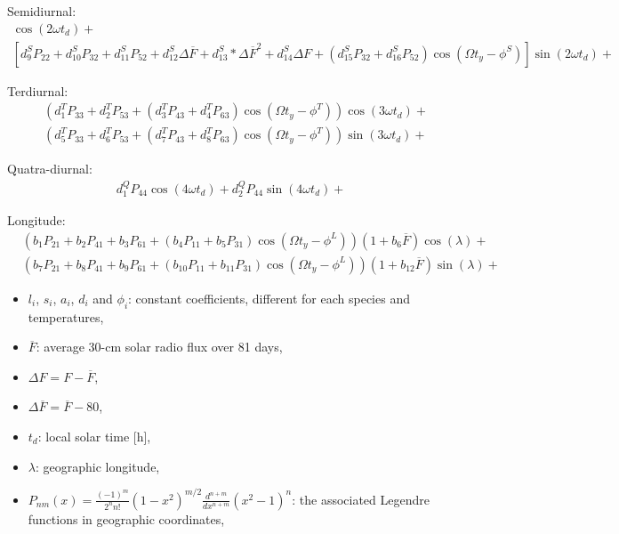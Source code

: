 \documentclass[referee,a4paper,12pt,traditabstract]{swsc}
\begin{document}
\begin{linenumbers}
Semidiurnal:
\begin{align*}
[d^S_1 P_{22} + d^S_2 P_{32} + d^S_3 P_{52} + d^S_4\Delta\overline{F} + d^S_5*\Delta\overline{F}^2 + d^S_6 \Delta F + (d^S_7 P_{32} + d^S_8 P_{52})\cos(\Omega t_y-\phi^S)]\cos(2\omega t_d) +\\
[d^S_9 P_{22} + d^S_{10} P_{32} + d^S_{11} P_{52} + d^S_{12}\Delta\overline{F} + d^S_{13}*\Delta\overline{F}^2 + d^S_{14} \Delta F + (d^S_{15} P_{32} + d^S_{16} P_{52})\cos(\Omega t_y-\phi^S)]\sin(2\omega t_d)+
\end{align*}

Terdiurnal:
\begin{align*}
&(d^T_1P_{33} + d^T_2 P_{53} + (d^T_3 P_{43} + d^T_4P_{63})\cos(\Omega t_y-\phi^T))\cos(3\omega t_d)+\\
&(d^T_5P_{33} + d^T_6 P_{53} + (d^T_7 P_{43} + d^T_8P_{63})\cos(\Omega t_y-\phi^T))\sin(3\omega t_d)+
\end{align*}

Quatra-diurnal:
\begin{align*}
d^Q_1 P_{44}\cos(4 \omega t_d) + d^Q_2 P_{44}\sin(4\omega t_d)+
\end{align*}

Longitude:
\begin{align*}
&(b_1 P_{21}+ b_2 P_{41}+ b_3 P_{61} +(b_4 P_{11}+b_5 P_{31})\cos(\Omega t_y-\phi^L))(1+b_6 \overline{F})\cos(\lambda) + \\
&(b_7 P_{21}+ b_8 P_{41}+ b_9 P_{61} +(b_{10} P_{11}+b_{11} P_{31})\cos(\Omega t_y-\phi^L))(1+b_{12} \overline{F})\sin(\lambda) +
\end{align*}

\begin{itemize}
\item $l_i$, $s_i$, $a_i$, $d_i$ and $\phi_i$: constant coefficients, different for each species and temperatures,
\item $\overline{F}$: average 30-cm solar radio flux over 81 days,
\item $\Delta F = F - \overline{F}$,
\item $\Delta \overline{F} = \overline{F} - 80$,
\item $t_d$: local solar time [h],
\item $\lambda$: geographic longitude,
\item $P_{nm}(x) = \frac{(-1)^m}{2^n n!} (1-x^2)^{m/2} \frac{d^{n+m}}{d x^{n+m}} (x^2 - 1)^n$: the associated Legendre functions in geographic coordinates,
\end{itemize}




\end{linenumbers}
\end{document}
